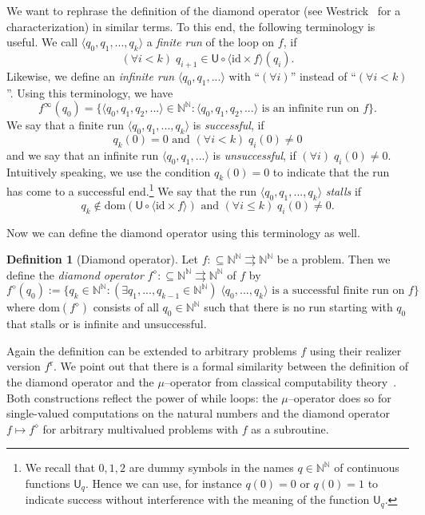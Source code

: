 \documentclass[11pt,a4paper]{amsart}
\theoremstyle{plain}
\theoremstyle{definition}
\newtheorem{defi}[thm]{Definition}
\theoremstyle{defC}
\theoremstyle{thmC}
\theoremstyle{plain}
\numberwithin{equation}{section}
\def\r{\mathrm{r}}
\def\IN{{\mathbb{N}}}
\def\In{\subseteq}
\def\mto{\rightrightarrows}
\def\U{{\mathsf{{U}}}}
\def\r{\mathrm{r}}
\def\id{{\mathrm{id}}}
\def\dom{{\mathrm{dom}}}
\begin{document}
We want to rephrase the definition of the diamond operator (see Westrick~\cite{Wes21} for a characterization) in similar terms.
To this end, the following terminology is useful. 
We call $\langle q_0,q_1,...,q_k\rangle$ a {\em finite run} of the loop on $f$,
if 
\[(\forall i<k)\;q_{i+1}\in \U\circ\langle \id\times f\rangle(q_i).\]
Likewise, we define an {\em infinite run} $\langle q_0,q_1,...\rangle$ with ``$(\forall i)$'' instead of ``$(\forall i<k)$''.
Using this terminology, we have
\[f^\infty(q_0)=\{\langle q_0,q_1,q_2,...\rangle\in\IN^\IN:\langle q_0,q_1,q_2,...\rangle\mbox{ is an infinite run on $f$}\}.\]
We say that a finite run $\langle q_0,q_1,...,q_k\rangle$ is {\em successful}, if
\[q_k(0)=0\mbox{ and }(\forall i<k)\;q_i(0)\not=0\]
and we say that an infinite run $\langle q_0,q_1,...\rangle$ is {\em unsuccessful}, if $(\forall i)\;q_i(0)\not=0$.
Intuitively speaking, we use the condition $q_k(0)=0$ to indicate that the run has come to a successful end.\footnote{We 
recall that $0,1,2$ are dummy symbols in the names $q\in\IN^\IN$ of continuous functions $\U_q$. Hence we can use, for instance $q(0)=0$ or $q(0)=1$ to indicate success without interference with the
meaning of the function $\U_q$.}
We say that the run $\langle q_0,q_1,...,q_k\rangle$ {\em stalls} if 
\[q_k\not\in\dom(\U\circ\langle\id\times f\rangle)\mbox{ and }(\forall i\leq k)\;q_i(0)\not=0.\]

\noindent
Now we can define the diamond operator using this terminology as well. 

\begin{defi}[Diamond operator]
Let $f:\In\IN^\IN\mto\IN^\IN$ be a problem. Then we define
the {\em diamond operator} $f^\diamond:\In\IN^\IN\mto\IN^\IN$ of $f$
by
\[f^\diamond(q_0):=\{q_k\in\IN^\IN:(\exists q_1,...,q_{k-1}\in\IN^\IN)\;\langle q_0,...,q_k\rangle\mbox{ is a successful finite run on $f$}\}\]
where $\dom(f^\diamond)$ consists of all $q_0\in\IN^\IN$ such that there is no run starting with $q_0$ that stalls or is infinite and unsuccessful.
\end{defi}

\noindent
Again the definition can be extended to arbitrary problems $f$ using their realizer version $f^\r$.
We point out that there is a formal similarity between the definition of the diamond operator and the $\mu$--operator
from classical computability theory~\cite{Odi89}. Both constructions reflect the power of while loops:
the $\mu$--operator does so for single-valued computations on the natural numbers and the 
diamond operator ${f\mapsto f^\diamond}$
for arbitrary multivalued problems with $f$ as a subroutine.
\end{document}
